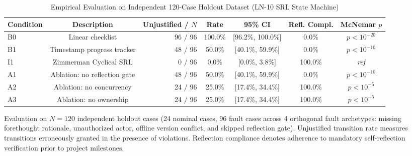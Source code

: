 \begin{table}[htbp]
\centering
\small
\caption{Empirical Evaluation on Independent 120-Case Holdout Dataset (LN-10 SRL State Machine)}
\label{tab:ln-10-holdout-benchmark}
\begin{tabular}{lcrcccc}
\toprule
Condition & Description & \multicolumn{1}{c}{Unjustified / $N$} & Rate & 95\% CI & Refl. Compl. & McNemar $p$ \\
\midrule
B0 & Linear checklist & 96 / 96 & 100.0\% & [96.2\%, 100.0\%] & 0.0\% & $p < 10^{-20}$ \\
B1 & Timestamp progress tracker & 48 / 96 & 50.0\% & [40.1\%, 59.9\%] & 0.0\% & $p < 10^{-10}$ \\
I1 & Zimmerman Cyclical SRL & 0 / 96 & 0.0\% & [0.0\%, 3.8\%] & 100.0\% & \textit{ref} \\
A1 & Ablation: no reflection gate & 48 / 96 & 50.0\% & [40.1\%, 59.9\%] & 0.0\% & $p < 10^{-10}$ \\
A2 & Ablation: no concurrency & 24 / 96 & 25.0\% & [17.4\%, 34.4\%] & 100.0\% & $p < 10^{-5}$ \\
A3 & Ablation: no ownership & 24 / 96 & 25.0\% & [17.4\%, 34.4\%] & 100.0\% & $p < 10^{-5}$ \\
\bottomrule
\end{tabular}
\par\smallskip
\begin{minipage}{0.98\linewidth}\footnotesize
Evaluation on $N=120$ independent holdout cases (24 nominal cases, 96 fault cases across 4 orthogonal fault archetypes: missing forethought rationale, unauthorized actor, offline version conflict, and skipped reflection gate). Unjustified transition rate measures transitions erroneously granted in the presence of violations. Reflection compliance denotes adherence to mandatory self-reflection verification prior to project milestones.
\end{minipage}
\end{table}
